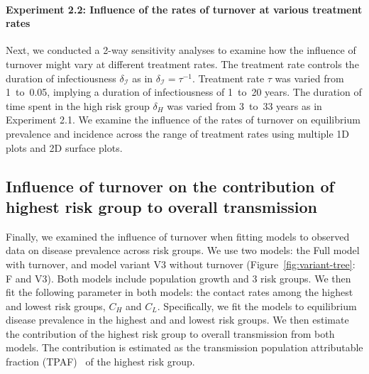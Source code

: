 \paragraph{Experiment 2.2: Influence of the rates of turnover at various treatment rates}
\label{p:exp-2-turnover-2}
Next, we conducted a 2-way sensitivity analyses to examine how
the influence of turnover might vary at different treatment rates.
The treatment rate controls the duration of infectiousness $\delta_{\mathcal{I}}$
as in $\delta_{\mathcal{I}} = \tau^{-1}$.
Treatment rate $\tau$ was varied from 1~to~0.05,
implying a duration of infectiousness of 1~to~20 years.
The duration of time spent in the high risk group $\delta_H$
was varied from 3~to~33 years as in Experiment 2.1.
We examine the influence of the rates of turnover on
equilibrium prevalence and incidence across the
range of treatment rates using multiple 1D plots and 2D surface plots.
\subsection{Influence of turnover on the contribution of highest risk group to overall transmission}
\label{ss:exp-turnover-fit}
Finally, we examined the influence of turnover when fitting models to observed data
on disease prevalence across risk groups.
We use two models: the Full model with turnover, and model variant V3 without turnover
(Figure~\ref{fig:variant-tree}: F and V3).
Both models include population growth and 3 risk groups.
We then fit the following parameter in both models:
the contact rates among the highest and lowest risk groups, $C_H$ and $C_L$.
Specifically, we fit the models to equilibrium disease prevalence
in the highest and and lowest risk groups.
We then estimate the contribution of the highest risk group to overall transmission from both models.
The contribution is estimated as
the transmission population attributable fraction (TPAF)~\citep{Mishra2016}
of the highest risk group.
